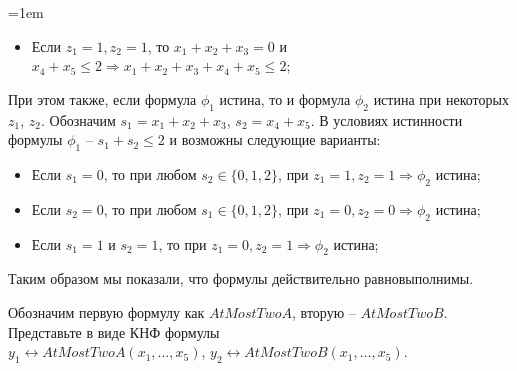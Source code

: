 \documentclass[12pt]{extreport}
\theoremstyle{definiton}
\theoremstyle{definition}
\theoremstyle{definition}
\let\leq\leqslant
\newenvironment{blockquote}{%
  \par%
  \medskip
  \leftskip=1em%
  \noindent}{%
  \par\medskip}
\begin{document}
\begin{blockquote}
{\begin{itemize}
	    \item Если $z_1 = 1, z_2 = 1$, то $x_1 + x_2 + x_3 = 0$ и $x_4 + x_5 \leq 2 \Rightarrow x_1 + x_2 + x_3 + x_4 + x_5 \leq 2$;
	\end{itemize}
	При этом также, если формула $\phi_1$ истина, то и формула $\phi_2$ истина при некоторых $z_1$, $z_2$. Обозначим $s_1 = x_1 + x_2 + x_3$, $s_2 = x_4 + x_5$. В условиях истинности формулы $\phi_1$ -- $s_1 + s_2 \leq 2$ и возможны следующие варианты:
	\begin{itemize}
	    \item Если $s_1 = 0$, то при любом $s_2 \in \{0, 1, 2\}$, при $z_1 = 1, z_2 = 1 \Rightarrow \phi_2$ истина;
	    \item Если $s_2 = 0$, то при любом $s_1 \in \{0, 1, 2\}$, при $z_1 = 0, z_2 = 0 \Rightarrow \phi_2$ истина;
	    \item Если $s_1 = 1$ и $s_2 = 1$, то при $z_1 = 0, z_2 = 1 \Rightarrow \phi_2$ истина;
	\end{itemize}
	Таким образом мы показали, что формулы действительно равновыполнимы.
	}
	\end{blockquote}

\Pr[10 баллов] Обозначим первую формулу как $AtMostTwoA$, вторую -- $AtMostTwoB$. Представьте в виде КНФ формулы\\$y_1 \leftrightarrow AtMostTwoA(x_1, \dots, x_5)$, $y_2 \leftrightarrow AtMostTwoB(x_1, \dots, x_5)$.
\end{document}
